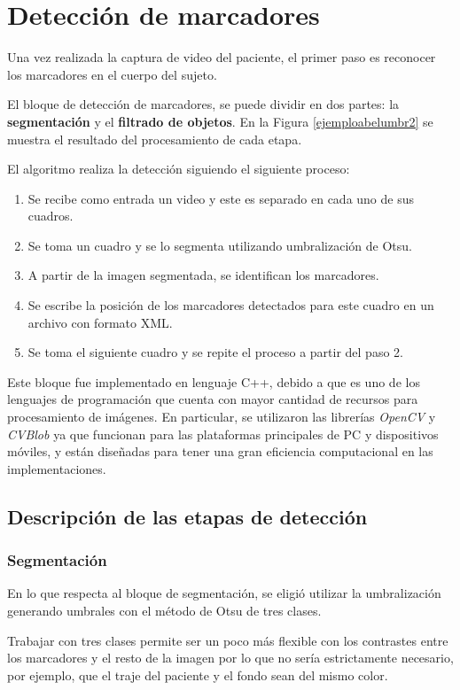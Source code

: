 \section{Detección de marcadores}
Una vez realizada la captura de video del paciente, el primer paso es reconocer los marcadores en el cuerpo del sujeto.

El bloque de detección de marcadores, se puede dividir en dos partes: la \textbf{segmentación} y el \textbf{filtrado de objetos}. En la Figura \ref{ejemploabelumbr2} se muestra el resultado del procesamiento de cada etapa.

El algoritmo realiza la detección siguiendo el siguiente proceso:

\begin{enumerate}
  \item Se recibe como entrada un video y este es separado en cada uno de sus cuadros.
  \item Se toma un cuadro y se lo segmenta utilizando umbralización de Otsu.
  \item A partir de la imagen segmentada, se identifican los marcadores.
  \item Se escribe la posición de los marcadores detectados para este cuadro en un archivo con formato XML.
  \item Se toma el siguiente cuadro y se repite el proceso a partir del paso 2.
\end{enumerate}

Este bloque fue implementado en lenguaje C++, debido a que es uno de los lenguajes de programación que cuenta con mayor cantidad de recursos para procesamiento de imágenes. En particular, se utilizaron las librerías \emph{OpenCV} \cite{opencv} y \emph{CVBlob} \cite{cvblob} ya que funcionan para las plataformas principales de PC y dispositivos móviles, y están diseñadas para tener una gran eficiencia computacional en las implementaciones.

\subsection{Descripción de las etapas de detección}
\subsubsection{Segmentación}
En lo que respecta al bloque de segmentación, se eligió utilizar la umbralización generando umbrales con el método de Otsu\cite{otsu} de tres clases.

Trabajar con tres clases permite ser un poco más flexible con los contrastes entre los marcadores y el resto de la imagen por lo que no sería estrictamente necesario, por ejemplo, que el traje del paciente y el fondo sean del mismo color.

